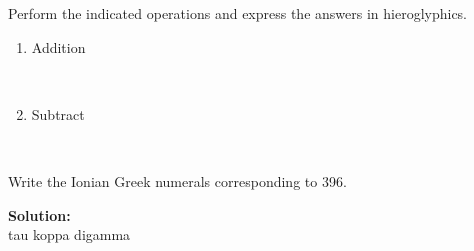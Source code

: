 \documentclass[12pt]{article}
\makeatletter
\theoremstyle{homework}
\newenvironment{exercise}[1]
{\def\@currentlabel{#1}\exercisecore}
{\endexercisecore}
\newcommand{\localhead}[1]{\par\smallskip\noindent\textbf{#1}\nobreak\\}%
\newcommand\solution{\localhead{Solution:}}
\makeatother
\begin{document}
\begin{exercise}{3} Perform the indicated operations and express the answers in hieroglyphics.\\
    \begin{enumerate}
        \item  Addition\\
        
        \begin{center}
        \cartouche{ \pmglyph{\Hone-\Hone-\Hone-\Hone-\Hone-\Hone-\Hone-\Hthousand-\HXthousand-\HXthousand-\HXthousand-\HXthousand-\HXthousand-\HXthousand}}\\
        \cartouche{ \pmglyph{\Hone-\Hone-\Hone-\Hone-\Hone-\Hten-\Hhundred-\Hhundred-\HXthousand-\HXthousand-\HXthousand-\HXthousand-\HXthousand}}
        \end{center}
        \begin{center}
            \cartouche{ \pmglyph{\Hone-\Hone-\Hone-\Hone-\Hone-\Hone-\Hone-\Hone-\Hone-\Hone-\Hone-\Hone-\Hten-\Hhundred-\Hhundred-\Hthousand-\HXthousand-\HXthousand-\HXthousand-\HXthousand-\HXthousand-\HXthousand-\HXthousand-\HXthousand-\HXthousand-\HXthousand-\HXthousand}}
        \end{center}
        \begin{center}
            \cartouche{ \pmglyph{\Hone-\Hone-\Hten-\Hten-\Hhundred-\Hhundred-\Hthousand-\HXthousand-\HCthousand}}
        \end{center}

        \item Subtract\\
        \begin{center}
            \cartouche{ \pmglyph{\Hone-\Hone-\Hten-\Hten-\Hten-\Hthousand}}\\
            \cartouche{ \pmglyph{\Hone-\Hone-\Hone-\Hone-\Hten-\Hten-\Hten-\Hten-\Hhundred-\Hhundred-\Hhundred}}
            \end{center}
            \begin{center}
                \cartouche{ \pmglyph{\Hone-\Hone-\Hone-\Hone-\Hone-\Hone-\Hone-\Hone-\Hten-\Hten-\Hten-\Hten-\Hten-\Hten-\Hten-\Hten-\Hhundred-\Hhundred-\Hhundred-\Hhundred-\Hhundred-\Hhundred}}
            \end{center}
    \end{enumerate}
\end{exercise}



\begin{exercise}{5} Write the Ionian Greek numerals corresponding to 396.

    \solution tau koppa digamma
\end{exercise}
\end{document}
